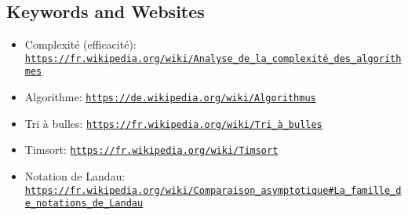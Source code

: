 \documentclass[a4paper,11pt]{report}
\newcommand{\BrochureUrlText}[1]{\texttt{#1}}
\begin{document}
{\raggedright

\subsection*{Keywords and Websites}

\begin{itemize}
  \item Complexité (efficacité): \href{https://fr.wikipedia.org/wiki/Analyse_de_la_complexit\%C3\%A9_des_algorithmes}{\BrochureUrlText{https://fr.wikipedia.org/wiki/Analyse\_de\_la\_complexité\_des\_algorithmes}}
  \item Algorithme: \href{https://de.wikipedia.org/wiki/Algorithmus}{\BrochureUrlText{https://de.wikipedia.org/wiki/Algorithmus}}
  \item Tri à bulles: \href{https://fr.wikipedia.org/wiki/Tri_\%C3\%A0_bulles}{\BrochureUrlText{https://fr.wikipedia.org/wiki/Tri\_à\_bulles}}
  \item Timsort: \href{https://fr.wikipedia.org/wiki/Timsort}{\BrochureUrlText{https://fr.wikipedia.org/wiki/Timsort}}
  \item Notation de Landau: \href{https://fr.wikipedia.org/wiki/Comparaison_asymptotique\#La_famille_de_notations_de_Landau_O,_o,_\%CE\%A9,_\%CF\%89,_\%CE\%98,_~}{\BrochureUrlText{https://fr.wikipedia.org/wiki/Comparaison\_asymptotique\#La\_famille\_de\_notations\_de\_Landau}}
\end{itemize}


}
\end{document}
